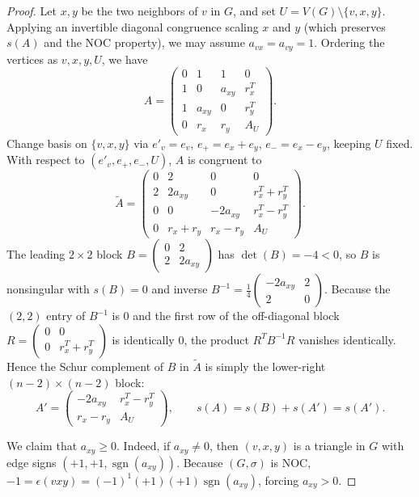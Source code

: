 \documentclass[10pt,letterpaper]{article}
\theoremstyle{zetaplain}
\theoremstyle{zetadef}
\theoremstyle{remark}
\numberwithin{equation}{section}
\DeclareMathOperator{\sgn}{sgn}
\begin{document}
\begin{proof}
Let $x, y$ be the two neighbors of $v$ in $G$, and set $U = V(G) \setminus \{v, x, y\}$. Applying an invertible diagonal congruence scaling $x$ and $y$ (which preserves $s(A)$ and the NOC property), we may assume $a_{vx} = a_{vy} = 1$. Ordering the vertices as $v, x, y, U$, we have
\[
  A = \begin{pmatrix}
    0 & 1 & 1 & 0 \\
    1 & 0 & a_{xy} & r_x^T \\
    1 & a_{xy} & 0 & r_y^T \\
    0 & r_x & r_y & A_U
  \end{pmatrix}.
\]
Change basis on $\{v, x, y\}$ via $e'_v = e_v$, $e_+ = e_x + e_y$, $e_- = e_x - e_y$, keeping $U$ fixed. With respect to $(e'_v, e_+, e_-, U)$, $A$ is congruent to
\[
  \tilde{A} = \begin{pmatrix}
    0 & 2 & 0 & 0 \\
    2 & 2a_{xy} & 0 & r_x^T + r_y^T \\
    0 & 0 & -2a_{xy} & r_x^T - r_y^T \\
    0 & r_x + r_y & r_x - r_y & A_U
  \end{pmatrix}.
\]
The leading $2 \times 2$ block $B = \begin{pmatrix} 0 & 2 \\ 2 & 2a_{xy} \end{pmatrix}$ has $\det(B) = -4 < 0$, so $B$ is nonsingular with $s(B) = 0$ and inverse $B^{-1} = \frac{1}{4}\begin{pmatrix} -2a_{xy} & 2 \\ 2 & 0 \end{pmatrix}$. Because the $(2, 2)$ entry of $B^{-1}$ is $0$ and the first row of the off-diagonal block $R = \begin{pmatrix} 0 & 0 \\ 0 & r_x^T + r_y^T \end{pmatrix}$ is identically $0$, the product $R^T B^{-1} R$ vanishes identically. Hence the Schur complement of $B$ in $\tilde{A}$ is simply the lower-right $(n - 2) \times (n - 2)$ block:
\[
  A' = \begin{pmatrix}
    -2a_{xy} & r_x^T - r_y^T \\
    r_x - r_y & A_U
  \end{pmatrix},
  \qquad s(A) = s(B) + s(A') = s(A').
\]

We claim that $a_{xy} \ge 0$. Indeed, if $a_{xy} \ne 0$, then $(v, x, y)$ is a triangle in $G$ with edge signs $(+1, +1, \sgn(a_{xy}))$. Because $(G, \sigma)$ is NOC, $-1 = \epsilon(vxy) = (-1)^1 (+1)(+1)\sgn(a_{xy})$, forcing $a_{xy} > 0$.


\end{proof}
\end{document}
